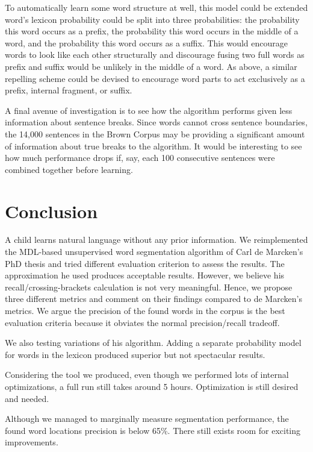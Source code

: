 \documentclass[11pt, oneside, fleqn]{article}
\begin{document}
	To automatically learn some word structure at well, this model could be extended word's lexicon probability could be split into three probabilities: the probability this word occurs as a prefix, the probability this word occurs in the middle of a word, and the probability this word occurs as a suffix. This would encourage words to look like each other structurally and discourage fusing two full words as prefix and suffix would be unlikely in the middle of a word. As above, a similar repelling scheme could be devised to encourage word parts to act exclusively as a prefix, internal fragment, or suffix.

	A final avenue of investigation is to see how the algorithm performs given less information about sentence breaks. Since words cannot cross sentence boundaries, the 14,000 sentences in the Brown Corpus may be providing a significant amount of information about true breaks to the algorithm. It would be interesting to see how much performance drops if, say, each 100 consecutive sentences were combined together before learning.

  \section{Conclusion}

  A child learns natural language without any prior information. We reimplemented the MDL-based unsupervised word segmentation algorithm of Carl de Marcken's PhD thesis and tried different evaluation criterion to assess the results.  The approximation he used produces acceptable results. However, we believe his recall/crossing-brackets calculation is not very meaningful. Hence, we propose three different metrics and comment on their findings compared to de Marcken's metrics. We argue the precision of the found words in the corpus is the best evaluation criteria because it obviates the normal precision/recall tradeoff.
  
  We also testing variations of his algorithm. Adding a separate probability model for words in the lexicon produced superior but not spectacular results.
  
  Considering the tool we produced, even though we performed lots of internal optimizations, a full run still takes around 5 hours. Optimization is still desired and needed. 

  Although we managed to marginally measure segmentation performance, the found word locations precision is below 65\%. There still exists room for exciting improvements.

{}

\end{document}
